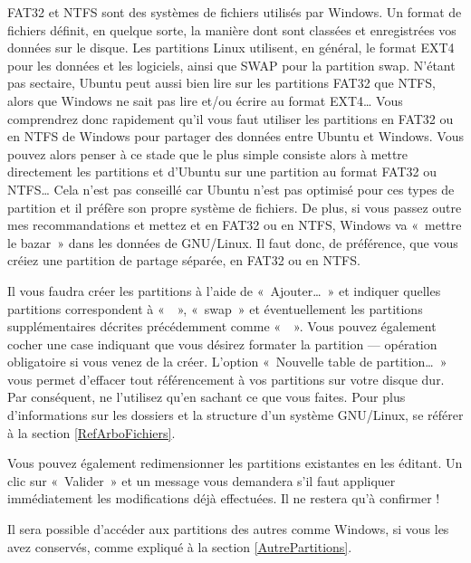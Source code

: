 \begin{itemize}
\begin{nota}
FAT32 et NTFS sont des systèmes de fichiers utilisés par Windows. Un format de fichiers définit, en quelque sorte, la manière dont sont classées et enregistrées vos données sur le disque. Les partitions Linux utilisent, en général, le format EXT4 pour les données et les logiciels, ainsi que SWAP pour la partition swap. N'étant pas sectaire, Ubuntu peut aussi bien lire sur les partitions FAT32 que NTFS, alors que Windows ne sait pas lire et/ou écrire au format EXT4\ldots{} Vous comprendrez donc rapidement qu'il vous faut utiliser les partitions en FAT32 ou en NTFS de Windows pour partager des données entre Ubuntu et Windows. Vous pouvez alors penser à ce stade que le plus simple consiste alors à mettre directement les partitions  et \Chemin{/} d'Ubuntu sur une partition au format FAT32 ou NTFS\dots{} Cela n'est pas conseillé car Ubuntu n'est pas optimisé pour ces types de partition et il préfère son propre système de fichiers. De plus, si vous passez outre mes recommandations et mettez  et \Chemin{/} en FAT32 ou en NTFS, Windows va «~mettre le bazar~» dans les données de GNU/Linux. Il faut donc, de préférence, que vous créiez une partition de partage séparée, en FAT32 ou en NTFS.
\end{nota}
\end{itemize}\par
Il vous faudra créer les partitions à l'aide de «~Ajouter\ldots{}~» et indiquer quelles partitions correspondent à «~\Chemin{/}~», «~swap~» et éventuellement les partitions supplémentaires décrites précédemment comme «~~». Vous pouvez également cocher une case indiquant que vous désirez formater la partition --- opération obligatoire si vous venez de la créer. L'option «~Nouvelle table de partition\ldots{}~» vous permet d'effacer tout référencement à vos partitions sur votre disque dur. Par conséquent, ne l'utilisez qu'en sachant ce que vous faites. Pour plus d'informations sur les dossiers et la structure d'un système GNU/Linux, se référer à la section \ref{RefArboFichiers}.\par
Vous pouvez également redimensionner les partitions existantes en les éditant. Un clic sur «~Valider~» et un message vous demandera s'il faut appliquer immédiatement les modifications déjà effectuées. Il ne restera qu'à confirmer !
\begin{nota}
Il sera possible d'accéder aux partitions des autres  comme Windows, si vous les avez conservés, comme expliqué à la section \ref{AutrePartitions}.
\end{nota}
